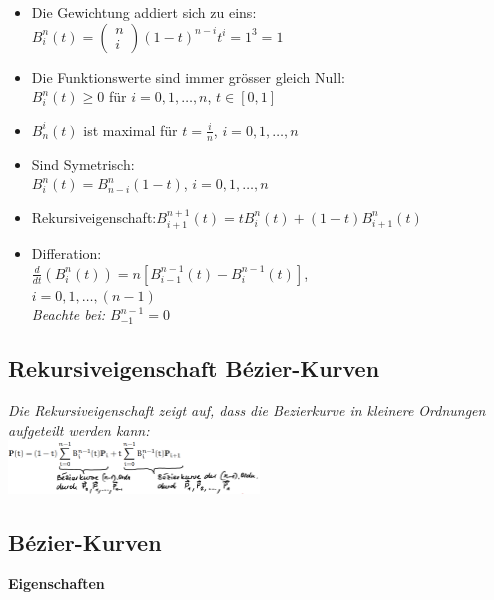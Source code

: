 \begin{itemize}
    \item Die Gewichtung addiert sich zu eins: \\
        $B_i^n(t) = \left(\begin{matrix}
            n \\ i
        \end{matrix}\right) (1 - t)^{n-i}t^i = 1^3 = 1$
    \item Die Funktionswerte sind immer grösser gleich Null:\\
        $B_i^n(t) \geq 0$ für $i = 0,1,\dots, n$, $t \in [0,1]$
    \item  $B^i_n(t)$ ist maximal für $t=\frac{i}{n}$, $i = 0,1,\dots, n$
    \item Sind Symetrisch: \\
          $B^n_i(t) = B^n_{n-i}(1-t)$, $i = 0,1,\dots, n$
    \item Rekursiveigenschaft:$B^{n+1}_{i+1}(t) = tB_i^n(t) + (1-t)B^n_{i+1}(t)$
    \item Differation: \\
        $\frac{d}{dt}(B^n_i(t)) = n[B^{n-1}_{i-1}(t) - B^{n-1}_i(t)]$,\\
        $i = 0,1,\dots, (n-1)$\\
        \textit{Beachte bei: $B_{-1}^{n-1}=0$}
\end{itemize}

\subsection{Rekursiveigenschaft Bézier-Kurven}

\textit{Die Rekursiveigenschaft zeigt auf, dass die Bezierkurve in
kleinere Ordnungen aufgeteilt werden kann:}\\

\includegraphics[width=0.5\textwidth]{assets/curves-recursive-spline.png}

\subsection{Bézier-Kurven}

\textbf{Eigenschaften}

